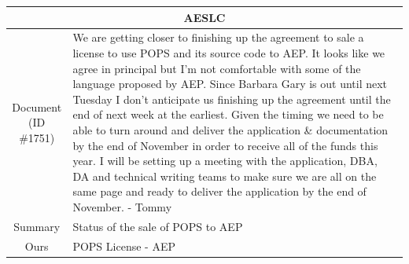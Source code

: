 \begin{table}[h!]
\scriptsize
  \centering
  \renewcommand{\arraystretch}{1.3}
  \begin{tabular}{c|p{}}
  \hline
  \multicolumn{2}{c}{AESLC} \\ \hline
  \makecell{Document\\(ID \#1751)} & We are getting closer to finishing up the agreement to sale a license to use POPS and its source code to AEP. It looks like we agree in principal but I'm not comfortable with some of the language proposed by AEP. Since Barbara Gary is out until next Tuesday I don't anticipate us finishing up the agreement until the end of next week at the earliest. Given the timing we need to be able to turn around and deliver the application \& documentation by the end of November in order to receive all of the funds this year. I will be setting up a meeting with the application, DBA, DA and technical writing teams to make sure we are all on the same page and ready to deliver the application by the end of November. - Tommy \\\hline
  Summary & Status of the sale of POPS to AEP \\\hline
  Ours & POPS License - AEP \\\hline
  

\end{tabular}
\end{table}
